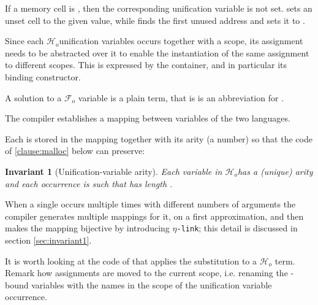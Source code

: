 \documentclass[sigconf,natbib=false,review]{acmart}
\newtheorem{invariant}{Invariant}
\newcommand{\linkMacro}[1]{\ensuremath{#1}\texttt{-link}\xspace}
\newcommand{\linketa} {\linkMacro{\eta}}
\newcommand{\Fo}{\texorpdfstring{\ensuremath{\mathcal{F}_{\!o}\xspace}}{Fo}} %
\newcommand{\Ho}{\texorpdfstring{\ensuremath{\mathcal{H}_o}\xspace}{Ho}}
\begin{document}


\noindent
If a memory cell is , then the corresponding unification variable
is not set.  sets an unset cell to the given value, while
 finds the first unused address and sets it to .

Since each \Ho unification variables occurs together with a scope,
its assignment needs to be abstracted over it to enable the
instantiation of the same assignment to different scopes.
This is expressed by the  container, and in particular
its  binding constructor.



\noindent
A solution to a \Fo{} variable is a plain term, that is 
is an abbreviation for .

The compiler establishes a mapping between variables of the two languages.



\noindent
Each  is stored in the mapping together with
its arity (a number) so that the code of \ref{clause:malloc} below can preserve:

\begin{invariant}[Unification-variable arity]\label{inv:uvaarity}
  Each variable 
  in \Ho has a (unique) arity  and each occurrence
   is such that  has length .
\end{invariant}



\noindent
When a single  occurs multiple times with different numbers
of arguments the compiler generates multiple mappings for it, on a first
approximation, and then makes the mapping bijective by introducing
\linketa; this detail is discussed in section \ref{sec:invariant1}.

% 
It is worth looking at the code of  that
applies the substitution to a \Ho{} term. Remark how assignments are moved
to the current scope, i.e. renaming the -bound variables
with the names in the scope of the unification variable occurrence.
\end{document}
